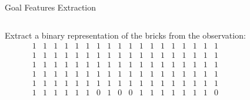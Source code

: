 \begin{frame}{Goal Features Extraction}
    \begin{columns}[c,onlytextwidth]
            \parbox{0.95\textwidth}{
                Extract a binary representation of the bricks from the
                observation:\\
                \begin{equation*}
                    \begin{smallmatrix}
                        1 & 1 & 1 & 1 & 1 & 1 & 1 & 1 & 1 & 1 & 1 & 1 & 1 & 1 & 1 & 1 & 1 & 1 \\
                        1 & 1 & 1 & 1 & 1 & 1 & 1 & 1 & 1 & 1 & 1 & 1 & 1 & 1 & 1 & 1 & 1 & 1 \\
                        1 & 1 & 1 & 1 & 1 & 1 & 1 & 1 & 1 & 1 & 1 & 1 & 1 & 1 & 1 & 1 & 1 & 1 \\
                        1 & 1 & 1 & 1 & 1 & 1 & 1 & 1 & 1 & 1 & 1 & 1 & 1 & 1 & 1 & 1 & 1 & 1 \\
                        1 & 1 & 1 & 1 & 1 & 1 & 1 & 1 & 1 & 1 & 1 & 1 & 1 & 1 & 1 & 1 & 1 & 1 \\
                        1 & 1 & 1 & 1 & 1 & 1 & 0 & 1 & 0 & 0 & 1 & 1 & 1 & 1 & 1 & 1 & 1 & 0 \\
                    \end{smallmatrix}
                \end{equation*}

}
\end{columns}
\end{frame}
